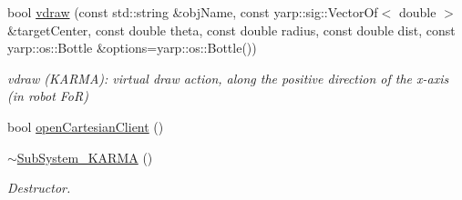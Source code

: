 \begin{DoxyCompactItemize}
bool \hyperlink{group__icubclient__subsystems_aaba06999b553acfd343004d1116b0111}{vdraw} (const std\+::string \&obj\+Name, const yarp\+::sig\+::\+Vector\+Of$<$ double $>$ \&target\+Center, const double theta, const double radius, const double dist, const yarp\+::os\+::\+Bottle \&options=yarp\+::os\+::\+Bottle())
\begin{DoxyCompactList}\small\item\em vdraw (K\+A\+R\+MA)\+: virtual draw action, along the positive direction of the x-\/axis (in robot FoR) \end{DoxyCompactList}\item 
bool \hyperlink{group__icubclient__subsystems_a8b5ae0fcd093f270e5bb4c32c60df252}{open\+Cartesian\+Client} ()
\item 
\hyperlink{group__icubclient__subsystems_af71df4017d78d4cebf6ea28ce8e1bbde}{$\sim$\+Sub\+System\+\_\+\+K\+A\+R\+MA} ()
\begin{DoxyCompactList}\small\item\em Destructor. \end{DoxyCompactList}\end{DoxyCompactItemize}
